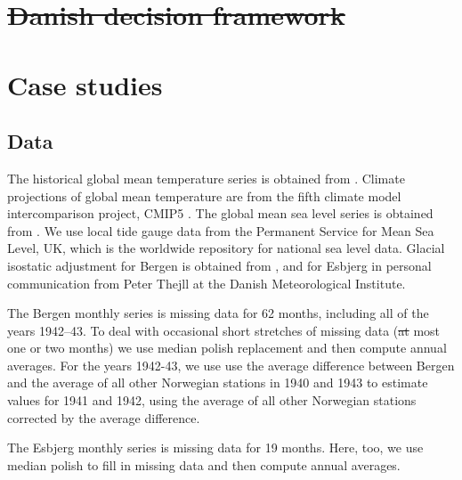 \documentclass[draft,linenumbers]{agujournal}
\providecommand{\DIFadd}[1]{{\protect\color{blue}\uwave{#1}}} %
\providecommand{\DIFdel}[1]{{\protect\color{red}\sout{#1}}}                      %
\providecommand{\DIFaddbegin}{} %
\providecommand{\DIFaddend}{} %
\providecommand{\DIFdelbegin}{} %
\providecommand{\DIFdelend}{} %
\begin{document}
\DIFdelbegin \section{\DIFdel{Danish decision framework}}
\addtocounter{section}{-1}%

\DIFdelend \section{Case studies}
\label{cases}

\subsection{Data \DIFaddbegin {\color{blue} \DIFadd{(PG)}}\DIFaddend }
The historical global mean temperature series is obtained from \citet{giss}. Climate projections of global mean temperature are from the fifth climate model intercomparison project, CMIP5 \citep{cmip5}. The global mean sea level series is obtained from \citet{csiro}. We use local tide gauge data from the Permanent Service for Mean Sea Level, UK, which is the worldwide repository for national sea level data. Glacial isostatic adjustment for Bergen is obtained from \citet{Simpson2014}, and for Esbjerg in personal communication from Peter Thejll at the Danish Meteorological Institute. 

The Bergen monthly series is missing data for 62 months, including all of the years 1942--43. To deal with occasional short stretches of missing data (\DIFdelbegin \DIFdel{at }\DIFdelend most one or two months) we use median polish replacement \citep{medpol} and then compute annual averages. For the years 1942-43, we use use the average difference between Bergen and the average of all other Norwegian stations in 1940 and 1943 to estimate values for 1941 and 1942, using the average of all other Norwegian stations corrected by the average difference. 

The Esbjerg monthly series is missing data for 19 months. Here, too, we use median polish to fill in missing data and then compute annual averages.
\end{document}
